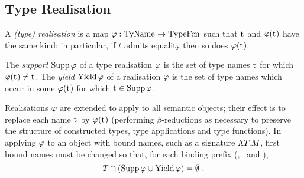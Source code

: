 




\subsection{Type Realisation}
\label{type-realisation-sec}

A {\sl (type)  realisation} is a map
$\varphi:{\rm TyName}^{}\to{\rm TypeFcn}^{}$
such that
${\rm t}^{{}}$ and $\varphi({\rm t}^{{}})$ have the same kind; in particular, if
 $t$ admits equality then so does $\varphi({\rm t}^{{}})$.

The {\sl support} $\mathop{\rm Supp}\nolimits\varphi$ of a type realisation $\varphi$ is the set of
type names ${\rm t}^{{}}$ for which $\varphi({\rm t}^{{}})\ne{\rm t}^{{}}$.
The {\sl yield} $\mathop{\rm Yield}\nolimits\varphi$ of a realisation $\varphi$ is the set of
type names which occur in some $\varphi({\rm t}^{{}})$ for which ${\rm t}^{{}}\in\mathop{\rm Supp}\nolimits\varphi$.
%

Realisations $\varphi$ are extended to apply to all semantic objects; their
effect is to
replace each name ${\rm t}^{{}}$ by $\varphi({\rm t}^{{}})$
(performing $\beta$-reductions as necessary to preserve the structure
of constructed types, type applications and type functions).
In applying $\varphi$ 
to an object with
bound names, such as a signature $\Lambda{\ensuremath{T}_{}}{.}{\ensuremath{M}_{}}$, first bound names must be
changed so that, for each binding prefix (, \exmod{\T}{\_}\ and  
\fun{\T}{\_}{\_}),
\[\T\cap(\Supp\tyrea\cup\Yield\tyrea)=\emptyset\ .\]


